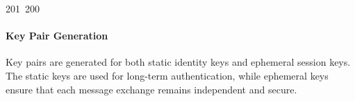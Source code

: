 201~200~\documentclass{article}
\begin{document}
	                                                                                                                                                                                                                                                                                                	                                                                                                                                        	    	                                                                                                	                                                                                                                                                                                                                                                                                                                                	                                                                        	                                                                        	                                                                                                                                        	                                                                                                                                                                                    \paragraph{Key Pair Generation}

	                                                                                                                                                                                                                                                                                                	                                                                                                                                        	    	                                                                                                	                                                                                                                                                                                                                                                                                                                                	                                                                        	                                                                        	                                                                                                                                        	                                                                                                                                                                                    Key pairs are generated for both static identity keys and ephemeral session keys. The static keys are used for long-term authentication, while ephemeral keys ensure that each message exchange remains independent and secure.
\end{document}
